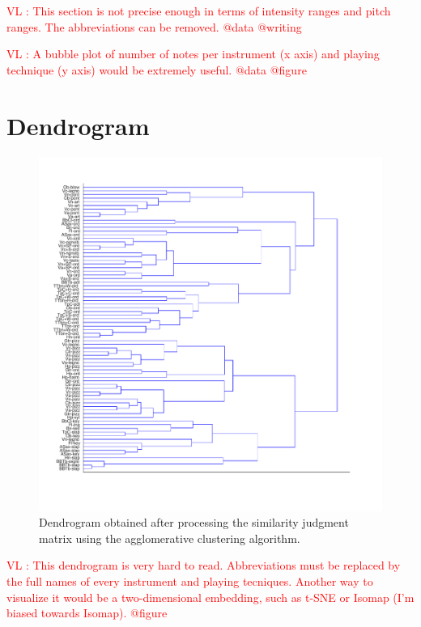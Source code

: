 \documentclass{article}
\newcommand{\vl}[1]{\textcolor{red}{VL : #1}}
\begin{document}
\vl{This section is not precise enough in terms of intensity ranges and pitch ranges.
The abbreviations can be removed. @data @writing}

\vl{A bubble plot of number of notes per instrument (x axis) and playing technique
(y axis) would be extremely useful. @data @figure}

\section{Dendrogram}

\begin{figure}
\center
\includegraphics[width = \textwidth]{figures/dendrogram.pdf}
\caption{Dendrogram obtained after processing the similarity judgment matrix using the agglomerative clustering algorithm.}
\label{fig:dendrogram}
\end{figure}

\vl{This dendrogram is very hard to read. Abbreviations must be replaced by the full names of every instrument and playing tecniques.
Another way to visualize it would be a two-dimensional embedding, such as t-SNE or Isomap (I'm biased towards Isomap). @figure
}
\end{document}

